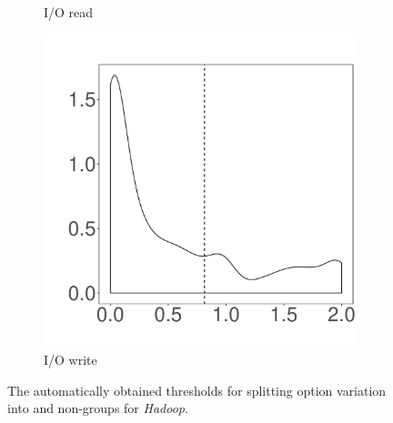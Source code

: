 \documentclass[10pt,journal,compsoc]{IEEEtran}
\begin{document}
\begin{figure}
\begin{subfigure}{0.19\textwidth}
                \caption{I/O read}
        \end{subfigure}
        \begin{subfigure}{0.19\textwidth}
                \includegraphics[width=\linewidth]{Figures/iowrite-hadoop-cluster.pdf}
                \caption{I/O write}
        \end{subfigure}
        
	\caption{The automatically obtained thresholds for splitting option variation into \inconsistent and non-\inconsistent groups for \emph{Hadoop}.} %
	\label{fig:threshold_hadoop}
\end{figure}
\end{document}
